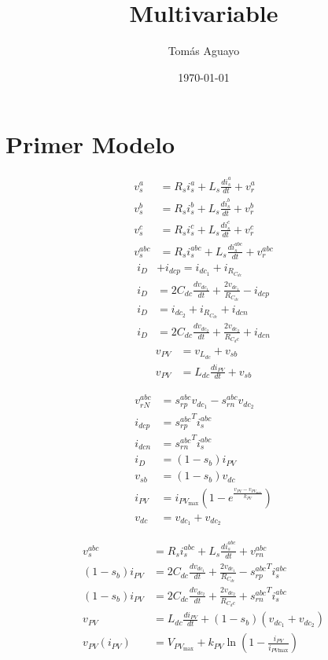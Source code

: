 \documentclass[11pt, a4paper]{article}
\title{\Huge \textbf{Multivariable}}
\author{\large Tomás Aguayo}
\date{\small \today}
\begin{document}
\maketitle
\section*{Primer Modelo}
\begin{align*}
    v_s^a&=R_si_s^a+L_s\frac{di_s^a}{dt}+v_r^a \\ 
    v_s^b&=R_si_s^b+L_s\frac{di_s^b}{dt}+v_r^b \\ 
    v_s^c&=R_si_s^c+L_s\frac{di_s^c}{dt}+v_r^c \\ 
    v_s^{abc}&=R_s i_s^{abc}+L_s\frac{di_s^{abc}}{dt}+v_r^{abc}
\end{align*}
\begin{align*}
    i_D&+i_{dcp} = i_{dc_1}+i_{R_{C_{dc}}} \\ 
    i_D &= 2C_{dc}\frac{dv_{dc_1}}{dt}+\frac{2v_{dc_1}}{R_{C_{dc}}}-i_{dcp} \tag{1} \label{eq:1} \\ 
    i_D &= i_{dc_2}+i_{R_{C_{dc}}}+i_{dcn} \\ 
    i_D &= 2C_{dc}\frac{dv_{dc_2}}{dt}+\frac{2v_{dc_2}}{R_{C_dc}}+i_{dcn} \tag{2} \label{eq:2}
\end{align*}
\begin{align*}
    v_{PV}&=v_{L_{dc}}+v_{sb}\\ 
    v_{PV}&=L_{dc}\frac{di_{PV}}{dt}+v_{sb}
\end{align*}

\begin{align*}
    v_{rN}^{abc}&=s_{rp}^{abc}v_{dc_1}-s_{rn}^{abc}v_{dc_2} \\ 
    i_{dcp}&={s_{rp}^{abc}}^Ti_{s}^{abc} \\
    i_{dcn}&={s_{rn}^{abc}}^T i_{s}^{abc} \\ 
    i_D&=(1-s_b)i_{PV} \\ 
    v_{sb}&=(1-s_b)v_{dc} \\ 
    i_{PV}&=i_{PV_\text{max}}\left(1-e^{\frac{v_{PV}-v_{PV_\text{max}}}{k_{PV}}}\right) \\ 
    v_{dc}&=v_{dc_1}+v_{dc_2}
\end{align*}
    
\begin{align*}
    v_s^{abc}&=R_s i_s^{abc}+L_s\frac{di_s^{abc}}{dt}+v_{rn}^{abc} \\ 
    (1-s_b)i_{PV} &= 2C_{dc}\frac{dv_{dc_1}}{dt}+\frac{2v_{dc_1}}{R_{C_{dc}}}-{s_{rp}^{abc}}^Ti_{s}^{abc} \\
    (1-s_b)i_{PV} &= 2C_{dc}\frac{dv_{dc_2}}{dt}+\frac{2v_{dc_2}}{R_{C_dc}}+{s_{rn}^{abc}}^T i_{s}^{abc} \\ 
    v_{PV}&=L_{dc}\frac{di_{PV}}{dt}+(1-s_b)(v_{dc_1}+v_{dc_2}) \\ 
    v_{PV}(i_{PV})&=V_{PV_\text{max}}+k_{PV}\ln\left(1-\frac{i_{PV}}{i_{PV\text{max}}}\right)
\end{align*}
\end{document}
